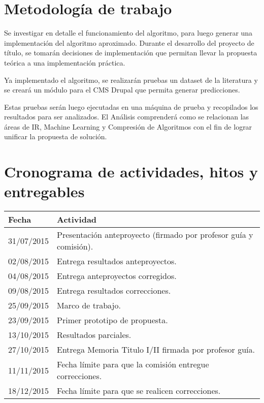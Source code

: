 \documentclass{udparticle}
\begin{document}
 
 
 

\section{Metodología de trabajo}


Se investigar en detalle el funcionamiento del algoritmo, para luego generar una implementación del algoritmo aproximado.
Durante el desarrollo del proyecto de título, se tomarán decisiones de implementación que permitan llevar la propuesta teórica a una implementación
práctica.

Ya implementado el algoritmo, se realizarán pruebas un dataset de la literatura y se creará un módulo para el CMS Drupal que permita generar predicciones.

Estas pruebas serán luego ejecutadas en una máquina de prueba y recopilados los resultados para ser analizados.
El Análisis comprenderá como se relacionan las áreas de IR, Machine Learning y Compresión de Algoritmos con el fin de lograr unificar la propuesta de solución. 


 



\section{Cronograma de actividades, hitos y entregables}
  \begin{tabular}{ll}
  \hline\noalign{\smallskip}
  Fecha & Actividad \\
  \hline\noalign{\smallskip}
  31/07/2015 & Presentación anteproyecto (firmado por profesor guía y comisión).\\
  02/08/2015 & Entrega resultados anteproyectos.\\
  04/08/2015 & Entrega anteproyectos corregidos.\\
  09/08/2015 &  Entrega resultados correcciones.\\
  25/09/2015 & Marco de trabajo.\\
  23/09/2015 & Primer prototipo de propuesta.\\
  13/10/2015 & Resultados parciales.\\
  27/10/2015 & Entrega Memoria Titulo I/II firmada por profesor guía.\\
  11/11/2015 & Fecha límite para que la comisión entregue correcciones.\\
  18/12/2015 & Fecha límite para que se realicen correcciones.\\

  \hline

  \end{tabular}
\end{document}
